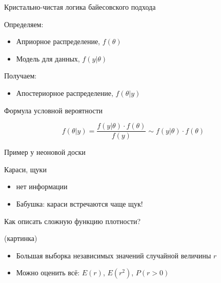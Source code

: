 \documentclass[ignorenonframetext,]{beamer}
\begin{document}
\begin{frame}{Кристально-чистая логика байесовского подхода}

Определяем:

\begin{itemize}
\item
  Априорное распределение, \(f(\theta)\)
\item
  Модель для данных, \(f(y|\theta)\)
\end{itemize}

Получаем:

\begin{itemize}
\itemsep1pt\parskip0pt
\item
  Апостериорное распределение, \(f(\theta|y)\)
\end{itemize}

\end{frame}

\begin{frame}{Формула условной вероятности}

\[
f(\theta|y)= \frac{f(y|\theta)\cdot f(\theta)}{f(y)} \sim f(y|\theta)\cdot f(\theta)
\]

\end{frame}

\begin{frame}{Пример у неоновой доски}

Караси, щуки

\begin{itemize}
\item
  нет информации
\item
  Бабушка: караси встречаются чаще щук!
\end{itemize}

\end{frame}

\begin{frame}{Как описать сложную функцию плотности?}

(картинка)

\begin{itemize}
\item
  Большая выборка независимых значений случайной величины \(r\)
\item
  Можно оценить всё: \(E(r)\), \(E(r^2)\), \(P(r>0)\)
\end{itemize}

\end{frame}
\end{document}
